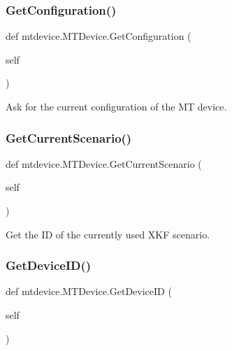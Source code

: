 \subsubsection{\texorpdfstring{Get\+Configuration()}{GetConfiguration()}}
{\footnotesize\ttfamily def mtdevice.\+M\+T\+Device.\+Get\+Configuration (\begin{DoxyParamCaption}\item[{}]{self }\end{DoxyParamCaption})}

\begin{DoxyVerb}Ask for the current configuration of the MT device.\end{DoxyVerb}
 \mbox{\label{classmtdevice_1_1MTDevice_ac63944270e1c85c2c4c9fcc500474ab5}} 
\subsubsection{\texorpdfstring{Get\+Current\+Scenario()}{GetCurrentScenario()}}
{\footnotesize\ttfamily def mtdevice.\+M\+T\+Device.\+Get\+Current\+Scenario (\begin{DoxyParamCaption}\item[{}]{self }\end{DoxyParamCaption})}

\begin{DoxyVerb}Get the ID of the currently used XKF scenario.\end{DoxyVerb}
 \mbox{\label{classmtdevice_1_1MTDevice_aa634cb80bc49f34e4a41fd9214f20d9a}} 
\subsubsection{\texorpdfstring{Get\+Device\+I\+D()}{GetDeviceID()}}
{\footnotesize\ttfamily def mtdevice.\+M\+T\+Device.\+Get\+Device\+ID (\begin{DoxyParamCaption}\item[{}]{self }\end{DoxyParamCaption})}

